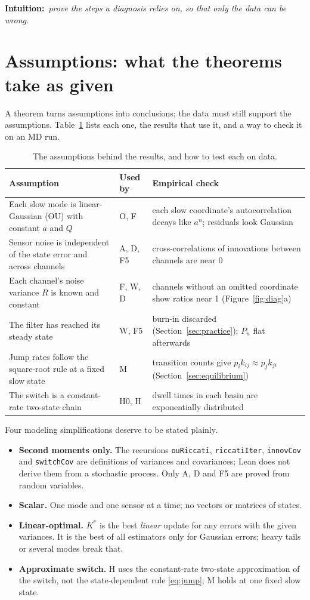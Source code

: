 \documentclass[11pt]{article}
\newcommand{\leanus}{\textunderscore\allowbreak}%
\newcommand{\lean}[1]{\begingroup\let\_\leanus\texttt{#1}\endgroup}
\newcommand{\intuition}[1]{\begin{intuitionbox}\textsf{\textbf{Intuition:}}\ \textit{#1}%
  \end{intuitionbox}}
\begin{document}
\intuition{prove the steps a diagnosis relies on, so that only the data can be wrong.}

\section{Assumptions: what the theorems take as given}

A theorem turns assumptions into conclusions; the data must still support the assumptions.
Table~\ref{tab:assume} lists each one, the results that use it, and a way to check it on an
MD run.

\begin{table}[htbp]
  \centering\small
  \begin{tabularx}{\linewidth}{@{}>{\raggedright}X l >{\raggedright}X@{}}
    \toprule
    \textbf{Assumption} & \textbf{Used by} & \textbf{Empirical check} \tabularnewline
    \midrule
    Each slow mode is linear-Gaussian (OU) with constant $a$ and $Q$
      & O, F & each slow coordinate's autocorrelation decays like $a^n$; residuals look
      Gaussian \tabularnewline
    Sensor noise is independent of the state error and across channels
      & A, D, F5 & cross-correlations of innovations between channels are near 0
      \tabularnewline
    Each channel's noise variance $R$ is known and constant
      & F, W, D & channels without an omitted coordinate show ratios near 1
      (Figure~\ref{fig:diag}a) \tabularnewline
    The filter has reached its steady state
      & W, F5 & burn-in discarded (Section~\ref{sec:practice}); $P_n$ flat afterwards
      \tabularnewline
    Jump rates follow the square-root rule at a fixed slow state
      & M & transition counts give $p_i k_{ij} \approx p_j k_{ji}$
      (Section~\ref{sec:equilibrium}) \tabularnewline
    The switch is a constant-rate two-state chain
      & H0, H & dwell times in each basin are exponentially distributed \tabularnewline
    \bottomrule
  \end{tabularx}
  \caption{The assumptions behind the results, and how to test each on data.}
  \label{tab:assume}
\end{table}

Four modeling simplifications deserve to be stated plainly.
\begin{itemize}
  \item \textbf{Second moments only.} The recursions \lean{ouRiccati}, \lean{riccatiIter},
    \lean{innovCov} and \lean{switchCov} are definitions of variances and covariances; Lean
    does not derive them from a stochastic process. Only A, D and F5 are proved from random
    variables.
  \item \textbf{Scalar.} One mode and one sensor at a time; no vectors or matrices of states.
  \item \textbf{Linear-optimal.} $K^*$ is the best \emph{linear} update for any errors with
    the given variances. It is the best of all estimators only for Gaussian errors; heavy
    tails or several modes break that.
  \item \textbf{Approximate switch.} H uses the constant-rate two-state approximation of the
    switch, not the state-dependent rule \eqref{eq:jump}; M holds at one fixed slow state.
\end{itemize}
\end{document}
